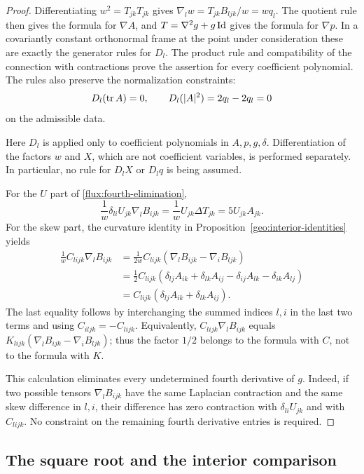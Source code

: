 \begin{proof}
Differentiating $w^2=T_{jk}T_{jk}$ gives
$\nabla_lw=T_{jk}B_{ljk}/w=wq_l$.  The quotient rule then gives the
formula for $\nabla A$, and $T=\nabla^2g+g\operatorname{Id}$ gives the formula for
$\nabla p$.  In a covariantly constant orthonormal frame at the point
under consideration these are exactly the generator rules for $D_l$.
The product rule and compatibility of the connection with contractions
prove the assertion for every coefficient polynomial.  The rules also
preserve the normalization constraints:
\[
 D_l(\operatorname{tr} A)=0,\qquad D_l(|A|^2)=2q_l-2q_l=0
\]
on the admissible data.

Here $D_l$ is applied only to coefficient polynomials in
$A,p,g,\delta$.  Differentiation of the factors $w$ and $X$, which are
not coefficient variables, is performed separately.  In particular, no
rule for $D_lX$ or $D_lq$ is being assumed.

For the $U$ part of \eqref{flux:fourth-elimination},
\[
 \frac1w\delta_{li}U_{jk}\nabla_lB_{ijk}
 =\frac1wU_{jk}\Delta T_{jk}=5U_{jk}A_{jk}.
\]
For the skew part, the curvature identity in
Proposition~\ref{geo:interior-identities} yields
\begin{align*}
 \frac1w C_{lijk}\nabla_lB_{ijk}
 &=\frac1{2w}C_{lijk}
       (\nabla_lB_{ijk}-\nabla_iB_{ljk})\\
 &=\frac12 C_{lijk}
   (\delta_{lj}A_{ik}+\delta_{lk}A_{ij}
       -\delta_{ij}A_{lk}-\delta_{ik}A_{lj})\\
 &=C_{lijk}(\delta_{lj}A_{ik}+\delta_{lk}A_{ij}).
\end{align*}
The last equality follows by interchanging the summed indices $l,i$
in the last two terms and using $C_{iljk}=-C_{lijk}$.  Equivalently,
$C_{lijk}\nabla_lB_{ijk}$ equals
$K_{lijk}(\nabla_lB_{ijk}-\nabla_iB_{ljk})$; thus the factor $1/2$
belongs to the formula with $C$, not to the formula with $K$.

This calculation eliminates every undetermined fourth derivative of
$g$.  Indeed, if two possible tensors $\nabla_lB_{ijk}$ have the same
Laplacian contraction and the same skew difference in $l,i$, their
difference has zero contraction with $\delta_{li}U_{jk}$ and with
$C_{lijk}$.  No constraint on the remaining fourth derivative entries is
required.
\end{proof}

\subsection{The square root and the interior comparison}

